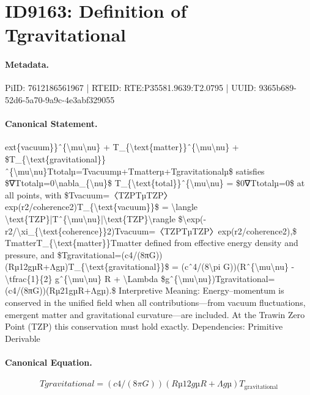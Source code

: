 \section*{ID9163: Definition of Tgravitational}
\paragraph{Metadata.}
PiID: 7612186561967 | RTEID: RTE:P35581.9639:T2.0795 | UUID: 9365b689-52d6-5a70-9a9c-4e3abf329055

\paragraph{Canonical Statement.}
ext\{vacuum\}\}ˆ\{\textbackslash{}mu\textbackslash{}nu\} + T\_\{\textbackslash{}text\{matter\}\}ˆ\{\textbackslash{}mu\textbackslash{}nu\} + \$T\_\{\textbackslash{}text\{gravitational\}\}ˆ\{\textbackslash{}mu\textbackslash{}nu\}Ttotalµ=Tvacuumµ+Tmatterµ+Tgravitationalµ\$ satisfies \$∇Ttotalµ=0\textbackslash{}nabla\_\{\textbackslash{}nu\}\$ T\_\{\textbackslash{}text\{total\}\}ˆ\{\textbackslash{}mu\textbackslash{}nu\} = \$0∇Ttotalµ=0\$ at all points, with \$Tvacuum=〈TZPTµTZP〉exp(r2/coherence2)T\_\{\textbackslash{}text\{vacuum\}\}\$ = \textbackslash{}langle \textbackslash{}text\{TZP\}|Tˆ\{\textbackslash{}mu\textbackslash{}nu\}|\textbackslash{}text\{TZP\}\textbackslash{}rangle \$\textbackslash{}exp(-r2/\textbackslash{}xi\_\{\textbackslash{}text\{coherence\}\}2)Tvacuum=〈TZPTµTZP〉exp(r2/coherence2),\$ TmatterT\_\{\textbackslash{}text\{matter\}\}Tmatter defined from effective energy density and pressure, and \$Tgravitational=(c4/(8πG))(Rµ12gµR+Λgµ)T\_\{\textbackslash{}text\{gravitational\}\}\$ = (cˆ4/(8\textbackslash{}pi G))(Rˆ\{\textbackslash{}mu\textbackslash{}nu\} -\textbackslash{}tfrac\{1\}\{2\} gˆ\{\textbackslash{}mu\textbackslash{}nu\} R + \textbackslash{}Lambda \$gˆ\{\textbackslash{}mu\textbackslash{}nu\})Tgravitational=(c4/(8πG))(Rµ21gµR+Λgµ).\$ Interpretive Meaning: Energy–momentum is conserved in the unified field when all contributions—from vacuum fluctuations, emergent matter and gravitational curvature—are included. At the Trawin Zero Point (TZP) this conservation must hold exactly. Dependencies: Primitive Derivable

\paragraph{Canonical Equation.}
\[
Tgravitational=(c4/(8πG))(Rµ12gµR+Λgµ)T_{\text{gravitational}}
\]

